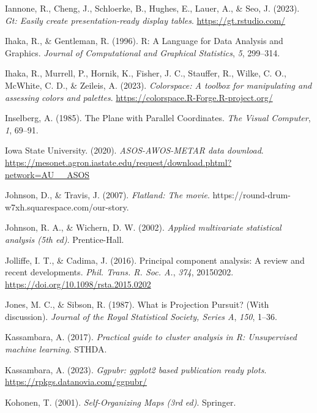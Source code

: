\documentclass[
  letterpaper,
]{krantz}
\newlength{\cslhangindent}
\newenvironment{CSLReferences}[2] %
 {\begin{list}{}{%
  \setlength{\itemindent}{0pt}
  \setlength{\leftmargin}{0pt}
  \setlength{\parsep}{0pt}
  \ifodd #1
   \setlength{\leftmargin}{\cslhangindent}
   \setlength{\itemindent}{-1\cslhangindent}
  \fi
  \setlength{\itemsep}{#2\baselineskip}}}
 {\end{list}}
\begin{document}
\begin{CSLReferences}{1}{0}
Iannone, R., Cheng, J., Schloerke, B., Hughes, E., Lauer, A., \& Seo, J.
(2023). \emph{Gt: Easily create presentation-ready display tables}.
\url{https://gt.rstudio.com/}

Ihaka, R., \& Gentleman, R. (1996). R: {A} {L}anguage for {D}ata
{A}nalysis and {G}raphics. \emph{Journal of Computational and Graphical
Statistics}, \emph{5}, 299--314.

Ihaka, R., Murrell, P., Hornik, K., Fisher, J. C., Stauffer, R., Wilke,
C. O., McWhite, C. D., \& Zeileis, A. (2023). \emph{Colorspace: A
toolbox for manipulating and assessing colors and palettes}.
\url{https://colorspace.R-Forge.R-project.org/}

Inselberg, A. (1985). {T}he {P}lane with {P}arallel {C}oordinates.
\emph{The Visual Computer}, \emph{1}, 69--91.

Iowa State University. (2020). \emph{ASOS-AWOS-METAR data download}.
\url{https://mesonet.agron.iastate.edu/request/download.phtml?network=AU__ASOS}

Johnson, D., \& Travis, J. (2007). \emph{Flatland: The movie}.
https://round-drum-w7xh.squarespace.com/our-story.

Johnson, R. A., \& Wichern, D. W. (2002). \emph{Applied multivariate
statistical analysis (5th ed)}. Prentice-Hall.

Jolliffe, I. T., \& Cadima, J. (2016). Principal component analysis: A
review and recent developments. \emph{Phil. Trans. R. Soc. A.},
\emph{374}, 20150202. \url{https://doi.org/10.1098/rsta.2015.0202}

Jones, M. C., \& Sibson, R. (1987). {W}hat is {P}rojection {P}ursuit?
(With discussion). \emph{Journal of the Royal Statistical Society,
Series A}, \emph{150}, 1--36.

Kassambara, A. (2017). \emph{Practical guide to cluster analysis in {R}:
Unsupervised machine learning}. STHDA.

Kassambara, A. (2023). \emph{Ggpubr: ggplot2 based publication ready
plots}. \url{https://rpkgs.datanovia.com/ggpubr/}

Kohonen, T. (2001). \emph{Self-{O}rganizing {M}aps (3rd ed)}. Springer.


\end{CSLReferences}
\end{document}
